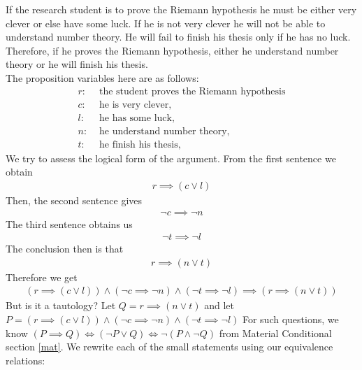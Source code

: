\documentclass[a4paper]{article}
\theoremstyle{plain}
\theoremstyle{definition}
\newtheorem{exmp}{Example}[section]
\theoremstyle{remark}
\begin{document}
\begin{tcolorbox}[colback=black!3!white,colframe=black!60!white,title=\begin{exmp}Riemann Hypothesis Statement \label{Riemann Hypothesis Statement}\end{exmp}]
If the research student is to prove the Riemann hypothesis he must be either very clever or else have some luck. If he is not very clever he will not be able to understand number theory. He will fail to finish his thesis only if he has no luck. Therefore, if he proves the Riemann hypothesis, either he understand number theory or he will finish his thesis.\\
The proposition variables here are as follows:
                \begin{align}
			r:&\text{ the student proves the Riemann hypothesis} \\
			c:& \text{ he is very clever,} \\
			l:& \text{ he has some luck,} \\
			n:& \text{ he understand number theory,} \\
			t:& \text{ he finish his thesis,}
                \end{align}
	We try to assess the logical form of the argument. From the first sentence we obtain
	\begin{align*}
		r \implies (c \lor l)
	\end{align*}
	Then, the second sentence gives
	\begin{align*}
		\neg c \implies \neg n
	\end{align*}
	The third sentence obtains us
	\begin{align*}
		\neg t \implies \neg l
	\end{align*}
	The conclusion then is that
	\begin{align*}
		r \implies (n \lor t)
	\end{align*}
	Therefore we get
	\begin{align*}
		(r \implies (c \lor l)) \land (\neg c \implies \neg n) \land (\neg t \implies \neg l) \implies (r \implies (n \lor t))
	\end{align*}
	But is it a tautology? Let $Q = r \implies ( n \lor t)$ and let $P =
		(r \implies (c \lor l)) \land (\neg c \implies \neg n) \land (\neg t \implies \neg l)$ For such questions, we know $(P \implies Q) \iff (\neg P \lor Q) \iff\neg (P \land \neg Q)$ from Material Conditional section \ref{mat}. We rewrite each of the small statements using our equivalence relations:
		\begin{align*}

\end{align*}
\end{tcolorbox}
\end{document}
